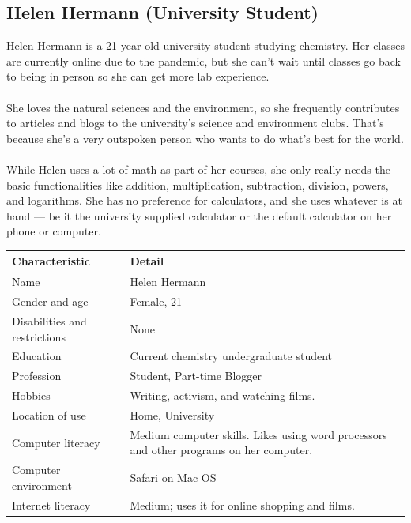 \documentclass[11pt,onside]{report}
\begin{document}
\subsection{Helen Hermann (University Student)}
\begin{description}
Helen Hermann is a 21 year old university student studying chemistry. Her classes are currently online due to the pandemic, but she can’t wait until classes go back to being in person so she can get more lab experience. \\ \\

She loves the natural sciences and the environment, so she frequently contributes to articles and blogs to the university’s science and environment clubs. That’s because she’s a very outspoken person who wants to do what’s best for the world.  \\ \\

While Helen uses a lot of math as part of her courses, she only really needs the basic functionalities like addition, multiplication, subtraction, division, powers, and logarithms. She has no preference for calculators, and she uses whatever is at hand — be it the university supplied calculator or the default calculator on her phone or computer.
\end{description}
\begin{center}
    \begin{tabular}{|p{4cm}|p{10cm}|}
        \hline
        \bf{Characteristic} & \bf{Detail} \\
        \hline
        Name &  Helen Hermann \\
        \hline
        Gender and age & Female, 21 \\
        \hline
        Disabilities and restrictions & None \\
        \hline
        Education & Current chemistry undergraduate student \\
        \hline
        Profession & Student, Part-time Blogger \\
        \hline
        Hobbies & Writing, activism, and watching films. \\
        \hline
        Location of use & Home, University \\
        \hline
        Computer literacy & Medium computer skills. Likes using word processors and other programs on her computer. \\
        \hline
        Computer environment &  Safari on Mac OS \\
        \hline
        Internet literacy &  Medium; uses it for online shopping and films. \\
        \hline
    \end{tabular}
\end{center}
\end{document}
